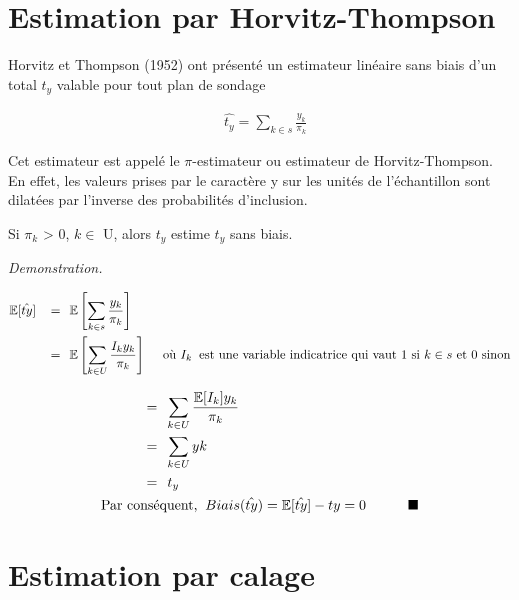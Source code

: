 \documentclass[11pt,fleqn]{book} %
\begin{document}
\section{Estimation par Horvitz-Thompson}

Horvitz et Thompson (1952) ont présenté un estimateur linéaire sans biais d'un total $t_y$ valable pour tout plan de sondage

\begin{align*}
&  \hat{t_{y}}=\sum_{k\in s} \frac{y_k}{\pi_k}  
\end{align*}


Cet estimateur est appelé le $\pi$-estimateur ou estimateur de Horvitz-Thompson. En effet, les valeurs prises par le caractère y sur les unités de l'échantillon sont dilatées par l'inverse des probabilités d'inclusion.\\


\begin{theorem}
Si $\pi_k$ > 0, $k\in$ U, alors $\hat{t_y}$ estime $t_y$ sans biais. 
\end{theorem}



\textit{Demonstration.}

\begin{align*}
& \mathbb{E}[\hat{ty}] \:\:\:\:=\:\: \mathbb{E}\left[ \sum_{k\in s} \frac{y_k}{\pi_k} \right]\\
& \quad\quad\quad =\:\: \mathbb{E}\left[ \sum_{k\in U} \frac{I_k y_k}{\pi_k} \right] \quad \textnormal{ où } I_k \: \textnormal{ est une variable indicatrice qui vaut 1 si } k\in s \textnormal{ et } 0 \textnormal{ sinon}\\
\end{align*}



\newpage

\begin{align*}
& \quad\quad\quad =\:\: \sum_{k\in U} \frac{\mathbb{E}[I_k] y_k}{\pi_k}\\
& \quad\quad\quad =\:\: \sum_{k\in U} yk\\
& \quad\quad\quad =\:\: t_y\\
& \textnormal{Par conséquent, }\: Biais(\hat{ty})=\mathbb{E}[\hat{ty}]-ty=0\quad\quad\quad \blacksquare
\end{align*}



\section{Estimation par calage}
\end{document}
